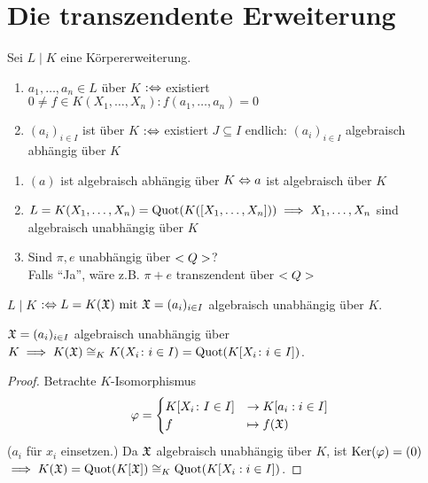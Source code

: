 \section{Die transzendente Erweiterung}
Sei $L\mid K$ eine Körpererweiterung.
\begin{definition}
	\begin{enumerate}
		\item $a_1, \dots, a_n \in L$  über $K$ $: \Leftrightarrow $ existiert \\$0 \neq f \in K(X_1,\dots, X_n) \colon f(a_1, \dots, a_n) = 0$
		\item $(a_i)_{i\in I}$ ist  über $K$ $:\Leftrightarrow$ existiert $J \subseteq I$ endlich: $(a_i)_{i\in I}$ algebraisch abhängig über $K$
	\end{enumerate}
\end{definition}
\begin{remark}
	\begin{enumerate}
		\item $(a)$ ist algebraisch abhängig über $K \Leftrightarrow a$ ist algebraisch über $K$
		\item $L = K(X_1,\dots, X_n) = \operatorname{Quot}(K([X_1,\dots, X_n])) \implies X_1,\dots, X_n$ sind algebraisch unabhängig über $K$
		\item Sind $\pi, e$ unabhängig über $<Q>$?\\
		Falls ``Ja'', wäre z.B. $\pi+e$ transzendent über $<Q>$
	\end{enumerate}
\end{remark}
\begin{definition}[reintranszendent]
	$L \mid K$  $:\Leftrightarrow L = K(\mathfrak{X}) \text{ mit } \mathfrak{X} = (a_i)_{i\in I}$ algebraisch unabhängig über $K$.
\end{definition}
\begin{lemma}
	$\mathfrak{X} = (a_i)_{i \in I}$ algebraisch unabhängig über $K \implies K(\mathfrak{X}) \cong_K K(X_i \colon i \in I) = \operatorname{Quot}(K[X_i \colon i \in I])$. 
\end{lemma}
\begin{proof}
	Betrachte $K$-Isomorphismus
	\begin{align*}
		\varphi = \begin{cases}
			K[X_i \colon I \in I] &\to K[a_i : i \in I]\\
			f & \mapsto f(\mathfrak{X})
		\end{cases} 
	\end{align*}
	($a_i$ für $x_i$ einsetzen.) Da $\mathfrak{X}$ algebraisch unabhängig über $K$, ist $\operatorname{Ker}(\varphi) = (0)$\\
	$\implies K(\mathfrak{X}) = \operatorname{Quot}(K[\mathfrak{X}]) \cong_K \operatorname{Quot}(K[X_i : i \in I])$.
\end{proof}

